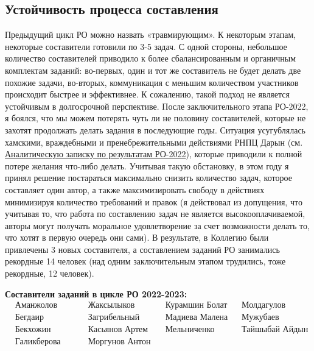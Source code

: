 \subsection{Устойчивость процесса составления}

Предыдущий цикл РО можно назвать «травмирующим». К некоторым этапам, некоторые составители готовили по 3-5 задач. С одной стороны, небольшое количество составителей приводило к более сбалансированным и органичным комплектам заданий: во-первых, один и тот же составитель не будет делать две похожие задачи, во-вторых, коммуникация с меньшим количеством участников происходит быстрее и эффективнее. К сожалению, такой подход не является устойчивым в долгосрочной перспективе. После заключительного этапа РО-2022, я боялся, что мы можем потерять чуть ли не половину составителей, которые не захотят продолжать делать задания в последующие годы. Ситуация усугублялась хамскими, враждебными и пренебрежительными действиями РНПЦ Дарын (см. \href{https://qazcho.kz/docs/reports/qazcho_respa_analysis.pdf}{Аналитическую записку по результатам РО-2022}), которые приводили к полной потере желания что-либо делать. Учитывая такую обстановку, в этом году я принял решение постараться максимально снизить количество задач, которое составляет один автор, а также максимизировать свободу в действиях минимизируя количество требований и правок (я действовал из допущения, что учитывая то, что работа по составлению задач не является высокооплачиваемой, авторы могут получать моральное удовлетворение за счет возможности делать то, что хотят в первую очередь они сами). В результате, в Коллегию были привлечены 3 новых составителя, а составлением заданий РО занимались рекордные 14 человек (над одним заключительным этапом трудились, тоже рекордные, 12 человек).

\textbf{Составители заданий в цикле РО 2022-2023:}\vspace{-1em}
\begin{align*}
    &\text{Аманжолов Азим} & &\text{Жаксылыков Азамат} & &\text{Курамшин Болат} & &\text{Молдагулов Галымжан} \\
    &\text{Бегдаир Санжар} & &\text{Загрибельный Богдан} & &\text{Мадиева Малена} & &\text{Мужубаев Абильмансур} \\
    &\text{Бекхожин Жанибек} & &\text{Касьянов Артем} & &\text{Мельниченко Даниил} & &\text{Тайшыбай Айдын} \\
    &\text{Галикберова Милана} & &\text{Моргунов Антон} & &\text{} & &\text{} 
\end{align*}

